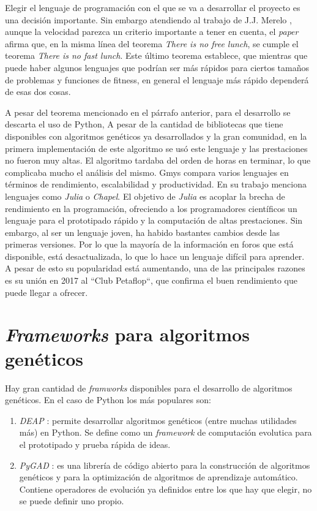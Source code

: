 Elegir el lenguaje de programación con el que se va a desarrollar el proyecto es una decisión importante. Sin embargo atendiendo al trabajo de J.J. Merelo \cite{fast_lunch}, aunque
la velocidad parezca un criterio importante a tener en cuenta, el \emph{paper} afirma que, en la misma línea del teorema \emph{There is no free lunch}, se cumple el teorema
\emph{There is no fast lunch}. Este último teorema establece, que mientras que puede haber algunos lenguajes que podrían ser más rápidos para ciertos tamaños de problemas y 
funciones de fitness, en general el lenguaje más rápido dependerá de esas dos cosas.

A pesar del teorema mencionado en el párrafo anterior, para el desarrollo se descarta el uso de Python, A pesar de la cantidad de bibliotecas que tiene disponibles con algoritmos 
genéticos ya desarrollados y la gran comunidad, en la primera implementación de este algoritmo se usó este lenguaje \cite{merelo_molina_2021} y las prestaciones no fueron muy altas. 
El algoritmo tardaba del orden de horas en terminar, lo que complicaba mucho el análisis del mismo. Gmys \cite{comparative_study} compara varios lenguajes en términos de rendimiento, 
escalabilidad y productividad. En su trabajo menciona lenguajes como \emph{Julia} o \emph{Chapel}. El objetivo de \emph{Julia} es acoplar la brecha de rendimiento en la programación, 
ofreciendo a los programadores científicos un lenguaje para el prototipado rápido y la computación de altas prestaciones. Sin embargo, al ser un lenguaje joven, ha habido bastantes
cambios desde las primeras versiones. Por lo que la mayoría de la información en foros que está disponible, está desactualizada, lo que lo hace un lenguaje difícil para aprender.
A pesar de esto su popularidad está aumentando, una de las principales razones es su unión en 2017 al ``Club Petaflop``, que confirma el buen rendimiento que puede llegar a ofrecer.  

\section{\textit{Frameworks} para algoritmos genéticos}

Hay gran cantidad de \emph{framworks} disponibles para el desarrollo de algoritmos genéticos. En el caso de Python los más populares son:

\begin{enumerate}
    \item \emph{DEAP} \cite{deap}: permite desarrollar algoritmos genéticos (entre muchas utilidades más) en Python. Se define como un \emph{framework}
    de computación evolutica para el prototipado y prueba rápida de ideas.
    \item \emph{PyGAD} \cite{pygad}: es una librería de código abierto para la construcción de algoritmos genéticos y para la optimización de algoritmos
    de aprendizaje automático. Contiene operadores de evolución ya definidos entre los que hay que elegir, no se puede definir uno propio.
\end{enumerate}

